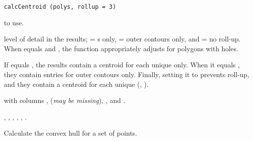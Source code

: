 \documentclass[letterpaper]{book}
\begin{document}
%
\begin{Usage}
\begin{verbatim}
calcCentroid (polys, rollup = 3)
\end{verbatim}
\end{Usage}
%
\begin{Arguments}
\begin{ldescription}
\item[\code{polys}]  to use.
\item[\code{rollup}] level of detail in the results;  = s
only,  = outer contours only, and  = no roll-up.  When
 equals  and , the function appropriately
adjusts for polygons with holes.
\end{ldescription}
\end{Arguments}
%
\begin{Details}\relax
If  equals , the results contain a centroid for
each unique  only.  When it equals , they contain
entries for outer contours only.  Finally, setting it to 
prevents roll-up, and they contain a centroid for each unique
(, ).
\end{Details}
%
\begin{Value}
 with columns ,  (\emph{may be missing}),
, and .
\end{Value}
%
\begin{SeeAlso}\relax
{},
,
,
,
,
.
\end{SeeAlso}
%
\begin{Examples}
\end{Examples}
%
\begin{Description}\relax
Calculate the convex hull for a set of points.
\end{Description}
\end{document}
